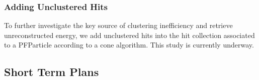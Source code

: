 \subsubsection{Adding Unclustered Hits}
\label{sec:adding_hits}

To further investigate the key source of clustering inefficiency
and retrieve unreconstructed energy,
we add unclustered hits into the hit collection associated to a 
PFParticle according to a cone algorithm.
This study is currently underway.\\

\subsection{Short Term Plans}
\label{sec:plans}

